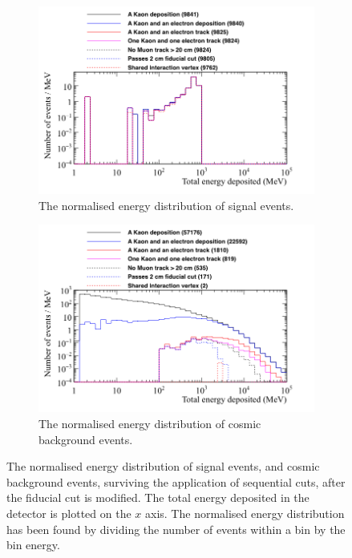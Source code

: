 \begin{figure}
  \centering
  \begin{subfigure}{0.8\textwidth}
    \includegraphics[width=\textwidth]{NucleonDecay_EnergyDepCuts_Norm}
    \caption{The normalised energy distribution of signal events.}
    \label{fig:NDK_FidCut_EnLim_Sig}
  \end{subfigure}
  \begin{subfigure}{0.8\textwidth}
    \includegraphics[width=\textwidth]{CosmicBackground_EnergyDepCuts_Norm}
    \caption{The normalised energy distribution of cosmic background events.}
    \label{fig:NDK_FidCut_EnLim_Cosmo}
  \end{subfigure}
  \caption[The normalised energy distribution of signal events, and cosmic background events, surviving the application of sequential cuts, after the fiducial cut is modified]
          {The normalised energy distribution of signal events, and cosmic background events, surviving the application of sequential cuts, after the fiducial cut is modified. The total energy deposited in the detector is plotted on the $x$ axis. The normalised energy distribution has been found by dividing the number of events within a bin by the bin energy.}
  \label{fig:NDK_FidCut_EnLim}
\end{figure}

